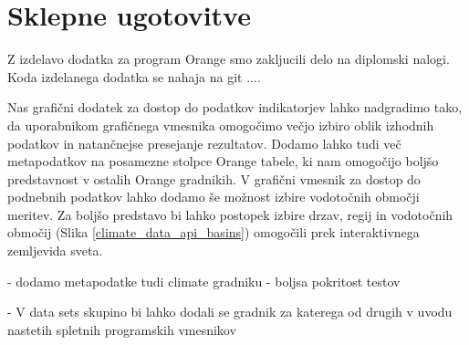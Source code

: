 \chapter{Sklepne ugotovitve}



Z izdelavo dodatka za program Orange smo zakljucili delo na diplomski nalogi.
Koda izdelanega dodatka se nahaja na git ....


% 
%
%
%
%


Nas grafični dodatek za dostop do podatkov indikatorjev lahko nadgradimo tako,
da uporabnikom grafičnega vmesnika omogočimo večjo izbiro oblik izhodnih
podatkov in natančnejse presejanje rezultatov. Dodamo lahko tudi več
metapodatkov na posamezne stolpce Orange tabele, ki nam omogočijo boljšo
predstavnost v ostalih Orange gradnikih. V grafični vmesnik za dostop do
podnebnih podatkov lahko dodamo še možnost izbire vodotočnih območji meritev.
Za boljšo predstavo bi lahko postopek izbire drzav, regij in vodotočnih
območij (Slika \ref{climate_data_api_basins}) omogočili prek interaktivnega zemljevida sveta.


- dodamo metapodatke tudi climate gradniku
- boljsa pokritost testov


- V data sets skupino bi lahko dodali se gradnik za katerega od drugih v uvodu
nastetih spletnih programskih vmesnikov
